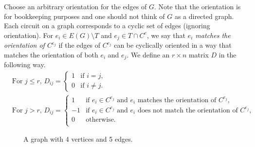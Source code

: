 \documentclass[ALCO,ThmDefs,Unicode,epreuves]{cedram}
\begin{document}
Choose an arbitrary orientation for the edges of $G$. Note that the orientation is for bookkeeping purposes and one should not think of $G$ as a directed graph. Each circuit on a graph corresponds to a cyclic set of edges (ignoring orientation). For $e_i \in E(G) \setminus T$ and $e_j \in T\cap C^e$, we say that \emph{$e_i$ matches the orientation of $C^{e_j}$} if the edges of $C^{e_j}$ can be cyclically oriented in a way that matches the orientation of both $e_i$ and $e_j$. We define an $r \times n$ matrix $D$ in the following way. 
\[
\begin{aligned}
&\text{For $j\le r$, }D_{ij} = \begin{cases}
1 & \text{if $i=j$,}\\
0 & \text{if $i\not= j$.}
\end{cases}
\\
&\text{For $j> r$, }D_{ij} = \begin{cases}
1 & \text{if $e_i \in C^{e_j}$ and $e_i$ matches the orientation of $C^{e_j}$,}\\
-1 & \text{if $e_i \in C^{e_j}$ and $e_i$ does not match the orientation of $C^{e_j}$,}\\
0 & \text{otherwise.}\\
\end{cases}
\end{aligned}
\]

\begin{figure}
\begin{center}
\caption{A graph with 4 vertices and 5 edges.}\label{fig:k4minus1}
\end{center}
\end{figure}
\end{document}
